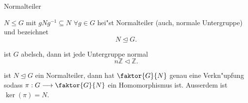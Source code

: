 \documentclass[class=article, crop=false]{standalone}
\begin{document}
\begin{zettel}{Normalteiler}
\begin{flashcard}
    $N \leq G$  mit $gNg^{-1}  \subseteq N$  $\forall g \in  G$  hei"st Normalteiler (auch, normale Untergruppe) und bezeichnet 
    \[
        N \trianglelefteq G 
    .\]
\end{flashcard}

\begin{example}[Normalteiler]
    ist $G$ abelsch, dann ist jede Untergruppe normal
    \[
        n \mathbb{Z} \triangleleft \mathbb{Z}
    .\]
    
\end{example}

\begin{theorem}
    ist $N \trianglelefteq G$ ein Normalteiler, dann hat $\faktor{G}{N}$ genau eine Verkn"upfung sodass $\pi : G \longrightarrow \faktor{G}{N}$ ein Homomorphismus ist. Ausserdem ist $ \ker ( \pi ) = N$.
\end{theorem}

\end{zettel}
\end{document}
